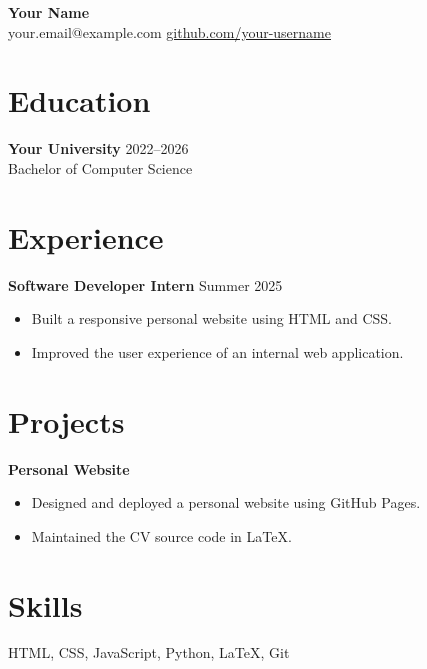 \documentclass[11pt,a4paper]{article}
\begin{document}
\begin{center}
  {\LARGE \textbf{Your Name}}\\
  \vspace{4pt}
  your.email@example.com \quad
  \href{https://github.com/your-username}{github.com/your-username}
\end{center}

\section*{Education}

\textbf{Your University} \hfill 2022--2026\\
Bachelor of Computer Science

\section*{Experience}

\textbf{Software Developer Intern} \hfill Summer 2025

\begin{itemize}
  \item Built a responsive personal website using HTML and CSS.
  \item Improved the user experience of an internal web application.
\end{itemize}

\section*{Projects}

\textbf{Personal Website}

\begin{itemize}
  \item Designed and deployed a personal website using GitHub Pages.
  \item Maintained the CV source code in LaTeX.
\end{itemize}

\section*{Skills}

HTML, CSS, JavaScript, Python, LaTeX, Git
\end{document}
